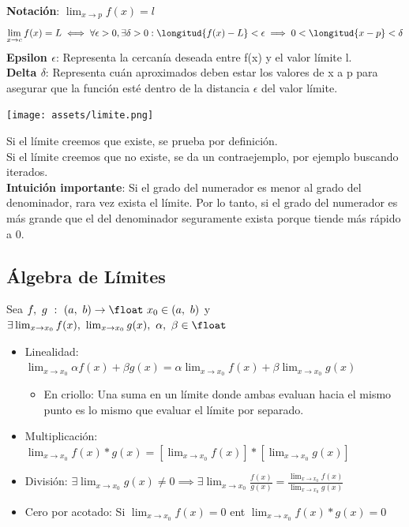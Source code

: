 \documentclass[10pt,a4paper]{article}
\begin{document}
\textbf{Notación}: $\lim_{x\to p} f(x) = l$ 
\[\lim_{x\to c} f(x) = L \iff \forall \epsilon > 0, \exists \delta > 0 : \longitud{f(x)-L} < \epsilon \implies 0 < \longitud{x-p} < \delta \] 
\textbf{Epsilon $\epsilon$}: Representa la cercanía deseada entre f(x) y el valor límite l. \\
\textbf{Delta $\delta$}: Representa cuán aproximados deben estar los valores de x a p para asegurar que la función esté dentro de la distancia $\epsilon$ del valor límite. 
\begin{center}
    \begin{minipage}[b]{0.5\textwidth}
        \texttt{[image: assets/limite.png]}
        \centering
        \label{fig:limite_nocion}
    \end{minipage}
\end{center}
Si el límite creemos que existe, se prueba por definición. \\
Si el límite creemos que no existe, se da un contraejemplo, por ejemplo buscando iterados. \\
\textbf{Intuición importante}: Si el grado del numerador es menor al grado del denominador, rara vez exista el límite. Por lo tanto, si el grado del numerador es más grande que el del denominador seguramente exista porque tiende más rápido a 0.
\subsection*{Álgebra de Límites}
Sea $f, \ g \ : \ (a, \ b) \rightarrow \float \ x_{0} \in (a, \ b)$ y $\exists \lim_{x\to x_{0}} f(x), \ \lim_{x\to x_{0}} g(x), \ \alpha, \ \beta \in \float  $
\begin{itemize}
    \item Linealidad: $\lim_{x\to x_{0}} \alpha f(x) + \beta g(x) = \alpha \lim_{x\to x_{0}} f(x) + \beta \lim_{x\to x_{0}} g(x) $
    \begin{itemize}
        \item En criollo: Una suma en un límite donde ambas evaluan hacia el mismo punto es lo mismo que evaluar el límite por separado. 
    \end{itemize}
    \item Multiplicación: $\lim_{x\to x_{0}} f(x) * g(x) = [\lim_{x\to x_{0}} f(x)] * [\lim_{x\to x_{0}} g(x)] $
    \item División: $\exists \lim_{x\to x_{0}} g(x) \neq 0 \implies \exists \lim_{x\to x_{0}} \frac{f(x)}{g(x)} = \frac{\lim_{x\to x_{0}} f(x)}{\lim_{x\to x_{0}} g(x)}  $
    \item Cero por acotado: Si $\lim_{x\to x_{0}} f(x) = 0$ ent $\lim_{x\to x_{0}} f(x) * g(x) = 0$

\end{itemize}
\end{document}
